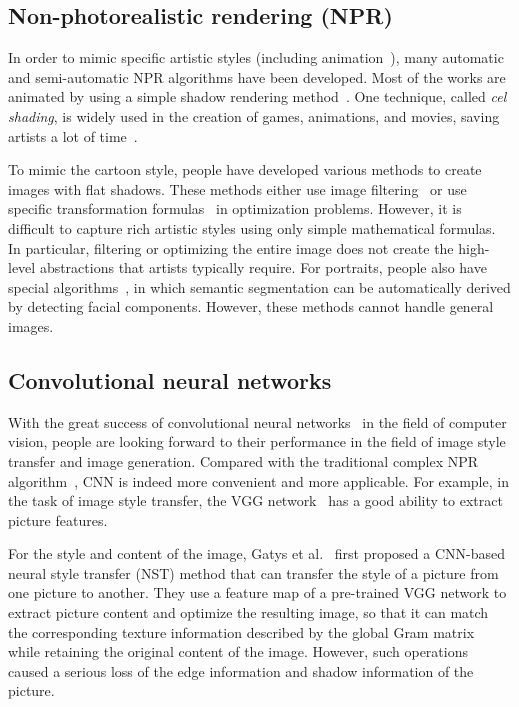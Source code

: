 \documentclass[10pt,twocolumn,letterpaper]{article}
\begin{document}
\subsection{Non-photorealistic rendering (NPR)}
In order to mimic specific artistic styles (including animation~\cite{rosin2012image}), many automatic and
semi-automatic NPR algorithms have been developed. Most of the works are animated by
using a simple shadow rendering method~\cite{saito1990comprehensible}. One technique, called  \textsl{cel shading}, is widely
used in the creation of games, animations, and movies, saving artists a lot of time~\cite{luque2012cel}.

To mimic the cartoon style, people have developed various methods to create
images with flat shadows. These methods either use image filtering~\cite{winnemoller2006real} or use specific
transformation formulas~\cite{xu2011image} in optimization problems. However, it is difficult to
capture rich artistic styles using only simple mathematical formulas. In
particular, filtering or optimizing the entire image does not create the
high-level abstractions that artists typically require. For portraits, people
also have special algorithms~\cite{yang2010semantics, rosin2015non}, in which semantic segmentation can be automatically
derived by detecting facial components. However, these methods cannot handle general images.

\subsection{Convolutional neural networks}
With the great success of convolutional neural networks~\cite{krizhevsky2012imagenet, lawrence1997face} in the field of
computer vision, people are looking forward to their performance in the
field of image style transfer and image generation. Compared with the
traditional complex NPR algorithm~\cite{saito1990comprehensible,luque2012cel}, CNN is indeed more convenient and more
applicable. For example, in the task of image style transfer, the VGG
network~\cite{VGG} has a good ability to extract picture features.

For the style and content of the image, Gatys et al.~\cite{NST} first proposed a
CNN-based neural style transfer (NST) method that can transfer the style
of a picture from one picture to another. They use a feature map of a
pre-trained VGG network to extract picture content and optimize the
resulting image, so that it can match the corresponding texture information
described by the global Gram matrix~\cite{gatys2015texture} while retaining the original content
of the image. However, such operations caused a serious loss of the edge
information and shadow information of the picture.
\end{document}

